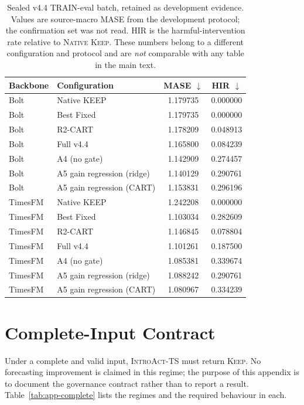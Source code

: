 \documentclass{article}
\newcommand{\introact}{\textsc{IntroAct-TS}}
\begin{document}
\begin{table}[h]
  \caption{Sealed v4.4 TRAIN-eval batch, retained as development evidence. Values are
  source-macro MASE from the development protocol; the confirmation set was not read. HIR is
  the harmful-intervention rate relative to \textsc{Native Keep}. These numbers belong to a
  different configuration and protocol and are \emph{not} comparable with any table in the main
  text.}
  \label{tab:app-train-eval}
  \centering
  \small
  \setlength{\tabcolsep}{4pt}
  \begin{tabular}{llcc}
    \toprule
    Backbone & Configuration & MASE $\downarrow$ & HIR $\downarrow$ \\
    \midrule
    Bolt     & Native KEEP            & 1.179735 & 0.000000 \\
    Bolt     & Best Fixed             & 1.179735 & 0.000000 \\
    Bolt     & R2-CART                & 1.178209 & 0.048913 \\
    Bolt     & Full v4.4              & 1.165800 & 0.084239 \\
    Bolt     & A4 (no gate)           & 1.142909 & 0.274457 \\
    Bolt     & A5 gain regression (ridge) & 1.140129 & 0.290761 \\
    Bolt     & A5 gain regression (CART)  & 1.153831 & 0.296196 \\
    \midrule
    TimesFM  & Native KEEP            & 1.242208 & 0.000000 \\
    TimesFM  & Best Fixed             & 1.103034 & 0.282609 \\
    TimesFM  & R2-CART                & 1.146845 & 0.078804 \\
    TimesFM  & Full v4.4              & 1.101261 & 0.187500 \\
    TimesFM  & A4 (no gate)           & 1.085381 & 0.339674 \\
    TimesFM  & A5 gain regression (ridge) & 1.088242 & 0.290761 \\
    TimesFM  & A5 gain regression (CART)  & 1.080967 & 0.334239 \\
    \bottomrule
  \end{tabular}
\end{table}

\section{Complete-Input Contract}
\label{app:complete}
Under a complete and valid input, \introact{} must return \textsc{Keep}. No forecasting
improvement is claimed in this regime; the purpose of this appendix is to document the
governance contract rather than to report a result. Table~\ref{tab:app-complete} lists the
regimes and the required behaviour in each.
\end{document}
